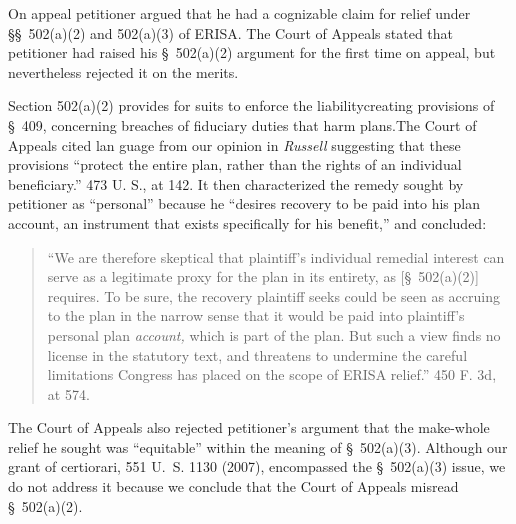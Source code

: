 {  On appeal petitioner argued that he had a cognizable claim for relief under \S\S~502(a)(2) and 502(a)(3) of ERISA. The Court of Appeals stated that petitioner had raised his \S~502(a)(2) argument for the first time on appeal, but nevertheless rejected it on the merits.

  Section 502(a)(2) provides for suits to enforce the liabilitycreating provisions of \S~409, concerning breaches of fiduciary duties that harm plans.\footnotemark[2] The Court of Appeals cited lan \newpage  guage from our opinion in \emph{Russell} suggesting that these provisions ``protect the entire plan, rather than the rights of an individual beneficiary.'' 473 U. S., at 142. It then characterized the remedy sought by petitioner as ``personal'' because he ``desires recovery to be paid into his plan account, an instrument that exists specifically for his benefit,'' and concluded:


      \begin{quote}

		  ``We are therefore skeptical that plaintiff's individual remedial interest can serve as a legitimate proxy for the plan in its entirety, as [\S~502(a)(2)] requires. To be sure, the recovery plaintiff seeks could be seen as accruing to the plan in the narrow sense that it would be paid into plaintiff's personal plan \emph{account,} which is part of the plan. But such a view finds no license in the statutory text, and threatens to undermine the careful limitations Congress has placed on the scope of ERISA relief.'' 450 F. 3d, at 574.

      \end{quote}

  The Court of Appeals also rejected petitioner's argument that the make-whole relief he sought was ``equitable'' within the meaning of \S~502(a)(3). Although our grant of certiorari, 551 U.~S. 1130 (2007), encompassed the \S~502(a)(3) issue, we do not address it because we conclude that the Court of Appeals misread \S~502(a)(2).

}
